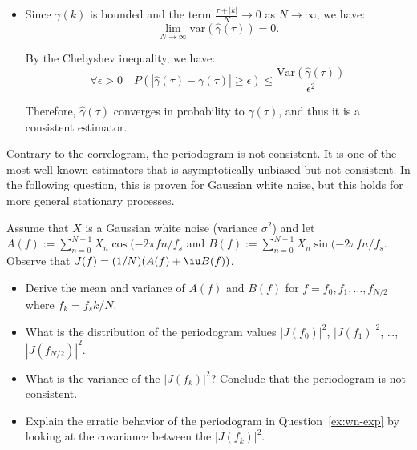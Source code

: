\documentclass[11pt]{article}
\begin{document}
\begin{solution}
\begin{itemize}
\begin{proof}
    \end{proof}
    
        \item Since $\gamma(k)$ is bounded and the term $\frac{\tau + |k|}{N} \to 0$ as $N \to \infty$, we have:
    \[
    \lim_{N \to \infty} \text{var}(\hat{\gamma}(\tau)) = 0.
    \]

    By the Chebyshev inequality, we have:
    \[
    \forall \epsilon > 0 \quad P(|\hat{\gamma}(\tau) - \gamma(\tau)| \geq \epsilon) \leq \frac{\text{Var}(\hat{\gamma}(\tau))}{\epsilon^2}
    \]

    
    Therefore, $\hat{\gamma}(\tau)$ converges in probability to $\gamma(\tau)$, and thus it is a consistent estimator.
    \end{itemize}
        
\end{solution}  %
    
Contrary to the correlogram, the periodogram is not consistent.
It is one of the most well-known estimators that is asymptotically unbiased but not consistent.
In the following question, this is proven for Gaussian white noise, but this holds for more general stationary processes.
\begin{exercise}
    Assume that $X$ is a Gaussian white noise (variance $\sigma^2$) and let $A(f):=\sum_{n=0}^{N-1} X_n \cos(-2\pi f n/f_s$ and $B(f):=\sum_{n=0}^{N-1} X_n \sin(-2\pi f n/f_s$.
    Observe that $J(f) = (1/N) (A(f) + \iu B(f))$.
    \begin{itemize}
        \item Derive the mean and variance of $A(f)$ and $B(f)$ for $f=f_0, f_1,\dots, f_{N/2}$ where $f_k=f_s k/N$.
        \item What is the distribution of the periodogram values $|J(f_0)|^2$, $|J(f_1)|^2$, \dots, $|J(f_{N/2})|^2$.
        \item What is the variance of the $|J(f_k)|^2$? Conclude that the periodogram is not consistent.
        \item Explain the erratic behavior of the periodogram in Question~\ref{ex:wn-exp} by looking at the covariance between the $|J(f_k)|^2$.
    \end{itemize}
    
\end{exercise}
\end{document}
